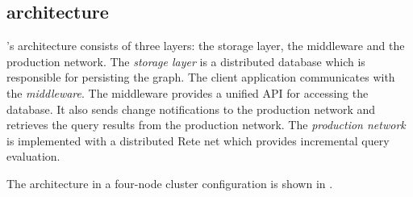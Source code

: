 \subsection{\iqd{} architecture}

\iqd{}'s architecture consists of three layers: the storage layer, the middleware and the production network. 
The \emph{storage layer} is a distributed database which is responsible for persisting the graph. 
The client application communicates with the \emph{middleware}. The middleware provides a unified API for accessing the database. It also sends change notifications to the production network and retrieves the query results from the production network. 
The \emph{production network} is implemented with a distributed Rete net which provides incremental query evaluation. 


The \iqd{} architecture in a four-node cluster configuration is shown in .
